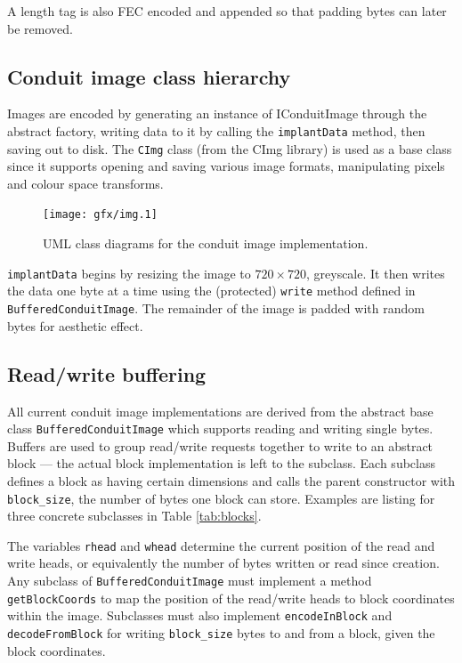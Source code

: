 A length tag is also FEC encoded and appended so that padding bytes can later be removed.


\FloatBarrier
\subsection{Conduit image class hierarchy}

Images are encoded by generating an instance of IConduitImage through the abstract factory, writing data to it by calling the {\tt implantData} method, then saving out to disk. The {\tt CImg} class (from the CImg library) is used as a base class since it supports opening and saving various image formats, manipulating pixels and colour space transforms.

    \begin{figure}[tbp]
        \begin{center}
                \texttt{[image: gfx/img.1]}
            \caption{UML class diagrams for the conduit image implementation.}
            \label{uml:img-classes}
        \end{center}
    \end{figure}
    
{\tt implantData} begins by resizing the image to $720 \times 720$, greyscale. It then writes the data one byte at a time using the (protected) {\tt write} method defined in {\tt BufferedConduitImage}. The remainder of the image is padded with random bytes for aesthetic effect.

\FloatBarrier
\subsection{Read/write buffering}

All current conduit image implementations are derived from the abstract base class {\tt BufferedConduitImage} which supports reading and writing single bytes. Buffers are used to group read/write requests together to write to an abstract block --- the actual block implementation is left to the subclass. Each subclass defines a block as having certain dimensions and calls the parent constructor with {\tt block\_size}, the number of bytes one block can store. Examples are listing for three concrete subclasses in Table \ref{tab:blocks}.

The variables {\tt rhead} and {\tt whead} determine the current position of the read and write heads, or equivalently the number of bytes written or read since creation. Any subclass of {\tt BufferedConduitImage} must implement a method {\tt getBlockCoords} to map the position of the read/write heads to block coordinates within the image. Subclasses must also implement {\tt encodeInBlock} and {\tt decodeFromBlock} for writing {\tt block\_size} bytes to and from a block, given the block coordinates.

